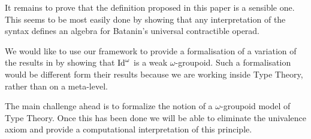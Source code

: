 It remains to prove that the definition proposed in this paper is a
sensible one. This seems to be most easily done by showing that any
interpretation of the syntax defines an algebra for Batanin's universal
contractible operad. 

We would like to use our framework to provide a formalisation of a
variation of the results in
\cite{lumsdaine10:weak-o-categories,berg08:types-are} by showing that
$\mathrm{Id}^\omega$ is a weak $\omega$-groupoid. Such a formalisation would be
different form their results because we are working inside Type
Theory, rather than on a meta-level.

The main challenge ahead is to formalize the notion of a
$\omega$-groupoid model of Type Theory. Once this has been done we
will be able to eliminate the univalence axiom and provide a
computational interpretation of this principle.






